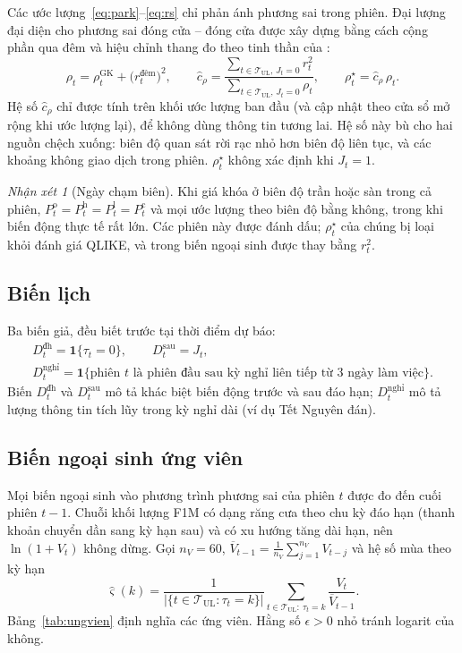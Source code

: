 \documentclass[12pt,a4paper]{article}
\theoremstyle{definition}
\theoremstyle{remark}
\newtheorem{nhanxet}{Nhận xét}[section]
\newcommand{\ind}{\mathbf{1}}
\begin{document}
Các ước lượng~\eqref{eq:park}--\eqref{eq:rs} chỉ phản ánh phương sai trong phiên. Đại lượng đại diện cho phương sai đóng cửa -- đóng cửa được xây dựng bằng cách cộng phần qua đêm và hiệu chỉnh thang đo theo tinh thần của \cite{hansenlunde2005rv}:
\begin{equation}\label{eq:proxy}
\rho_t=\rho^{\mathrm{GK}}_t+\big(r^{\text{đêm}}_t\big)^2,\qquad
\hat c_\rho=\frac{\sum_{t\in\mathcal T_{\mathrm{UL}},\,J_t=0}r_t^2}{\sum_{t\in\mathcal T_{\mathrm{UL}},\,J_t=0}\rho_t},\qquad
\rho^{\star}_t=\hat c_\rho\,\rho_t .
\end{equation}
Hệ số $\hat c_\rho$ chỉ được tính trên khối ước lượng ban đầu (và cập nhật theo cửa sổ mở rộng khi ước lượng lại), để không dùng thông tin tương lai. Hệ số này bù cho hai nguồn chệch xuống: biên độ quan sát rời rạc nhỏ hơn biên độ liên tục, và các khoảng không giao dịch trong phiên. $\rho^{\star}_t$ không xác định khi $J_t=1$.

\begin{nhanxet}[Ngày chạm biên]
Khi giá khóa ở biên độ trần hoặc sàn trong cả phiên, $P^{\mathrm o}_t=P^{\mathrm h}_t=P^{\mathrm l}_t=P^{\mathrm c}_t$ và mọi ước lượng theo biên độ bằng không, trong khi biến động thực tế rất lớn. Các phiên này được đánh dấu; $\rho^{\star}_t$ của chúng bị loại khỏi đánh giá QLIKE, và trong biến ngoại sinh được thay bằng $r_t^2$.
\end{nhanxet}

\subsection{Biến lịch}

Ba biến giả, đều biết trước tại thời điểm dự báo:
\begin{gather}
D^{\text{đh}}_t=\ind\{\tau_t=0\},\qquad D^{\text{sau}}_t=J_t,\\
D^{\text{nghỉ}}_t=\ind\{\text{phiên } t \text{ là phiên đầu sau kỳ nghỉ liên tiếp từ } 3 \text{ ngày làm việc}\}.
\end{gather}
Biến $D^{\text{đh}}_t$ và $D^{\text{sau}}_t$ mô tả khác biệt biến động trước và sau đáo hạn; $D^{\text{nghỉ}}_t$ mô tả lượng thông tin tích lũy trong kỳ nghỉ dài (ví dụ Tết Nguyên đán).

\subsection{Biến ngoại sinh ứng viên}\label{sec:bienngoaisinh}

Mọi biến ngoại sinh vào phương trình phương sai của phiên $t$ được đo đến cuối phiên $t-1$. Chuỗi khối lượng F1M có dạng răng cưa theo chu kỳ đáo hạn (thanh khoản chuyển dần sang kỳ hạn sau) và có xu hướng tăng dài hạn, nên $\ln(1+V_t)$ không dừng. Gọi $n_V=60$, $\overline V_{t-1}=\frac1{n_V}\sum_{j=1}^{n_V}V_{t-j}$ và hệ số mùa theo kỳ hạn
\begin{equation}
\hat\varsigma(k)=\frac{1}{|\{t\in\mathcal T_{\mathrm{UL}}:\tau_t=k\}|}\sum_{t\in\mathcal T_{\mathrm{UL}}:\ \tau_t=k}\frac{V_t}{\overline V_{t-1}} .
\end{equation}
Bảng~\ref{tab:ungvien} định nghĩa các ứng viên. Hằng số $\epsilon>0$ nhỏ tránh logarit của không.
\end{document}
